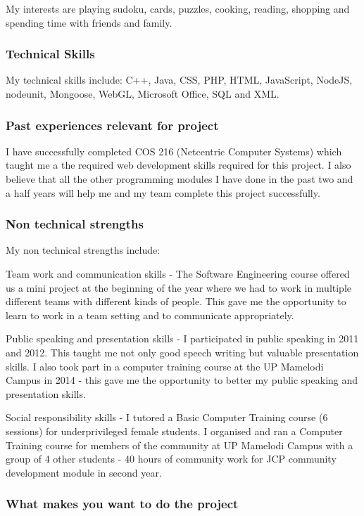\documentclass[hidelinks, 12pt, oneside]{article}
\begin{document}
My interests are playing sudoku, cards, puzzles, cooking, reading, shopping and spending time with friends and family.

\subsubsection{Technical Skills}

My technical skills include: C++, Java, CSS, PHP, HTML, JavaScript, NodeJS, nodeunit, Mongoose, WebGL, Microsoft Office, SQL and XML.
 
\subsubsection{Past experiences relevant for project}

I have successfully completed COS 216 (Netcentric Computer Systems)  which taught me a the required web development skills required for this project. I also believe that all the other programming modules I have done in the past two and a half years will help me and my team complete this project successfully.

\subsubsection{Non technical strengths}

My non technical strengths include: 

Team work and communication skills - The Software Engineering course offered us a mini project at the beginning of the year where we had to work in multiple different teams with different kinds of people. This gave me the opportunity to learn to work in a team setting and to communicate appropriately.
 
Public speaking and presentation skills - I participated in public speaking in 2011 and 2012. This taught me not only good speech writing but valuable presentation skills.
I also took part in a computer training course at the UP Mamelodi Campus in 2014 - this gave me the opportunity to better my public speaking and presentation skills.

Social responsibility skills - I tutored a Basic Computer Training course (6 sessions) for underprivileged female students.
I organised and ran a Computer Training course for members of the community at UP Mamelodi Campus with a group of 4 other students - 40 hours of community work for JCP community development module in second year.

\subsubsection{What makes you want to do the project}
\end{document}
